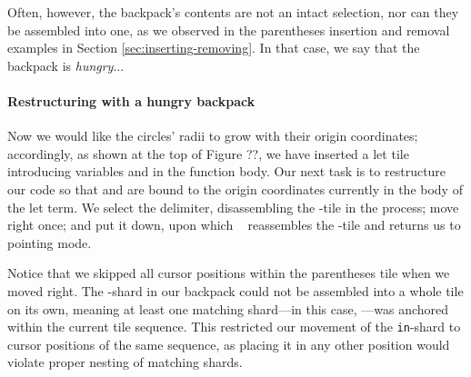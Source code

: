
Often, however, the backpack's contents are not an intact
selection, nor can they be assembled into one, as we observed
in the parentheses insertion and removal examples in Section \ref{sec:inserting-removing}.
In that case, we say that the backpack is \emph{hungry}...

\paragraph{Restructuring with a hungry backpack}

Now we would like the circles' radii to grow
with their origin coordinates; accordingly,
as shown at the top of Figure ??,
we have inserted
a let tile introducing variables  and 
in the function body.
Our next task is to restructure our code so that 
and  are bound to the origin coordinates
 currently in the body of the let term.
We select the  delimiter,
disassembling the -tile in the process;
move right once; and put it down,
upon which \tylr~ reassembles the -tile
and returns us to pointing mode.



Notice that we skipped all cursor positions within
the parentheses tile when we moved right.
The -shard in our backpack could not be assembled into
a whole tile on its own, meaning at least one matching shard---in
this case, ---was
anchored within the current tile sequence.
This restricted our movement of the \texttt{in}-shard
to cursor positions of the same sequence,
as placing it in any other position would
violate proper nesting of matching shards.


